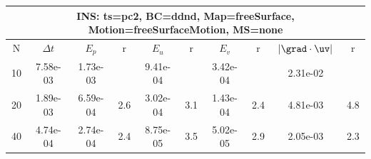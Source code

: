 
\begin{tabular}{|c|c|c|c|c|c|c|c|c|c|} \hline
 \multicolumn{10}{|c|}{INS: ts=pc2, BC=ddnd, Map=freeSurface, Motion=freeSurfaceMotion, MS=none } \\ \hline 
     N  &   $\Delta t$ & $E_p$   &  r  &   $E_u$   &   r    &   $E_v$   & r   &  $|\grad\cdot\uv|$  & r   \\ \hline 
  10   &  7.58e-03  &   1.73e-03  &        &   9.41e-04  &        &   3.42e-04  &        &   2.31e-02  &        \\ 
  20   &  1.89e-03  &   6.59e-04  & 2.6  &   3.02e-04  & 3.1  &   1.43e-04  & 2.4  &   4.81e-03  & 4.8  \\ 
  40   &  4.74e-04  &   2.74e-04  & 2.4  &   8.75e-05  & 3.5  &   5.02e-05  & 2.9  &   2.05e-03  & 2.3  \\ 
 \hline 
\end{tabular}
